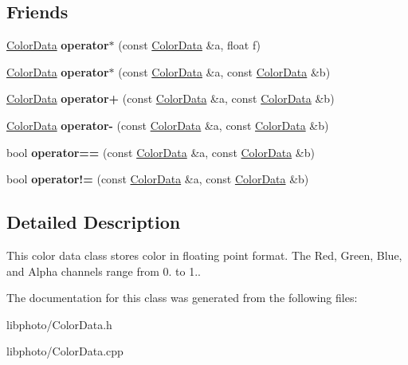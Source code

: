 \subsection*{Friends}
\begin{DoxyCompactItemize}
\item 
\hypertarget{classColorData_adf9a770243996e50282d248a4327f351}{\hyperlink{classColorData}{Color\-Data} {\bfseries operator$\ast$} (const \hyperlink{classColorData}{Color\-Data} \&a, float f)}\label{classColorData_adf9a770243996e50282d248a4327f351}

\item 
\hypertarget{classColorData_afdc3e8e6338798779739352e6bdfa42b}{\hyperlink{classColorData}{Color\-Data} {\bfseries operator$\ast$} (const \hyperlink{classColorData}{Color\-Data} \&a, const \hyperlink{classColorData}{Color\-Data} \&b)}\label{classColorData_afdc3e8e6338798779739352e6bdfa42b}

\item 
\hypertarget{classColorData_afee00faf26189979b72f3854a17200ae}{\hyperlink{classColorData}{Color\-Data} {\bfseries operator+} (const \hyperlink{classColorData}{Color\-Data} \&a, const \hyperlink{classColorData}{Color\-Data} \&b)}\label{classColorData_afee00faf26189979b72f3854a17200ae}

\item 
\hypertarget{classColorData_a799bd54f65a61569b5b968062ac0d37e}{\hyperlink{classColorData}{Color\-Data} {\bfseries operator-\/} (const \hyperlink{classColorData}{Color\-Data} \&a, const \hyperlink{classColorData}{Color\-Data} \&b)}\label{classColorData_a799bd54f65a61569b5b968062ac0d37e}

\item 
\hypertarget{classColorData_a9dae9e77610393d100312c9d248f09cc}{bool {\bfseries operator==} (const \hyperlink{classColorData}{Color\-Data} \&a, const \hyperlink{classColorData}{Color\-Data} \&b)}\label{classColorData_a9dae9e77610393d100312c9d248f09cc}

\item 
\hypertarget{classColorData_a698ac263a286afe37e3b9ed0c5882c8c}{bool {\bfseries operator!=} (const \hyperlink{classColorData}{Color\-Data} \&a, const \hyperlink{classColorData}{Color\-Data} \&b)}\label{classColorData_a698ac263a286afe37e3b9ed0c5882c8c}

\end{DoxyCompactItemize}


\subsection{Detailed Description}
This color data class stores color in floating point format. The Red, Green, Blue, and Alpha channels range from 0. to 1.. 

The documentation for this class was generated from the following files\-:\begin{DoxyCompactItemize}
\item 
libphoto/Color\-Data.\-h\item 
libphoto/Color\-Data.\-cpp\end{DoxyCompactItemize}
